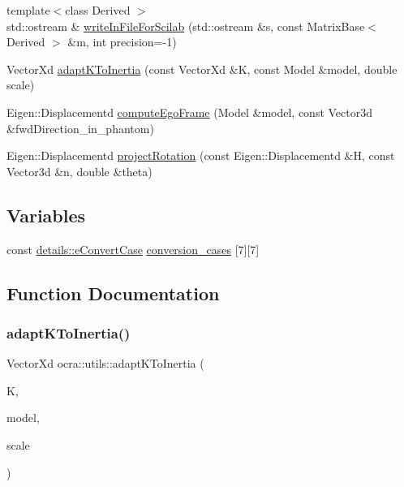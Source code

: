 \begin{DoxyCompactItemize}
\item 
{\footnotesize template$<$class Derived $>$ }\\std\+::ostream \& \hyperlink{namespaceocra_1_1utils_a11933c4ad5ae5b9bdce3005941bdd433}{write\+In\+File\+For\+Scilab} (std\+::ostream \&s, const Matrix\+Base$<$ Derived $>$ \&m, int precision=-\/1)
\item 
Vector\+Xd \hyperlink{namespaceocra_1_1utils_acfdf52324cf9c44fbe5225d17d5ff926}{adapt\+K\+To\+Inertia} (const Vector\+Xd \&K, const Model \&model, double scale)
\item 
Eigen\+::\+Displacementd \hyperlink{namespaceocra_1_1utils_aaad3b464589711bcc5fecec8c8b9af76}{compute\+Ego\+Frame} (Model \&model, const Vector3d \&fwd\+Direction\+\_\+in\+\_\+phantom)
\item 
Eigen\+::\+Displacementd \hyperlink{namespaceocra_1_1utils_a07cf93b22e02458b2c184ddd5787a6b2}{project\+Rotation} (const Eigen\+::\+Displacementd \&H, const Vector3d \&n, double \&theta)
\end{DoxyCompactItemize}
\subsection*{Variables}
\begin{DoxyCompactItemize}
\item 
const \hyperlink{namespaceocra_1_1utils_1_1details_a617d399055aa54cfdf2d3199ca91c399}{details\+::e\+Convert\+Case} \hyperlink{namespaceocra_1_1utils_a4775079ee4f9f6c7620af882e8092c62}{conversion\+\_\+cases} \mbox{[}7\mbox{]}\mbox{[}7\mbox{]}
\end{DoxyCompactItemize}


\subsection{Function Documentation}
\hypertarget{namespaceocra_1_1utils_acfdf52324cf9c44fbe5225d17d5ff926}{}\label{namespaceocra_1_1utils_acfdf52324cf9c44fbe5225d17d5ff926} 
\subsubsection{\texorpdfstring{adapt\+K\+To\+Inertia()}{adaptKToInertia()}\hspace{0.1cm}{\footnotesize\ttfamily [1/2]}}
{\footnotesize\ttfamily Vector\+Xd ocra\+::utils\+::adapt\+K\+To\+Inertia (\begin{DoxyParamCaption}\item[{const Vector\+Xd \&}]{K,  }\item[{const Model \&}]{model,  }\item[{double}]{scale }\end{DoxyParamCaption})}



